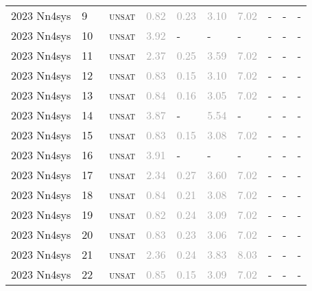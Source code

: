 \begin{center}
{\begin{longtable}{@{}llllllllll@{}}
2023 Nn4sys & 9 & ~\textsc{unsat} & \textcolor{darkgray}{0.82} & \textcolor{darkgray}{0.23} & \textcolor{darkgray}{3.10} & \textcolor{darkgray}{7.02} & - & - & - \\
2023 Nn4sys & 10 & ~\textsc{unsat} & \textcolor{darkgray}{3.92} & - & - & - & - & - & - \\
2023 Nn4sys & 11 & ~\textsc{unsat} & \textcolor{darkgray}{2.37} & \textcolor{darkgray}{0.25} & \textcolor{darkgray}{3.59} & \textcolor{darkgray}{7.02} & - & - & - \\
2023 Nn4sys & 12 & ~\textsc{unsat} & \textcolor{darkgray}{0.83} & \textcolor{darkgray}{0.15} & \textcolor{darkgray}{3.10} & \textcolor{darkgray}{7.02} & - & - & - \\
2023 Nn4sys & 13 & ~\textsc{unsat} & \textcolor{darkgray}{0.84} & \textcolor{darkgray}{0.16} & \textcolor{darkgray}{3.05} & \textcolor{darkgray}{7.02} & - & - & - \\
2023 Nn4sys & 14 & ~\textsc{unsat} & \textcolor{darkgray}{3.87} & - & \textcolor{darkgray}{5.54} & - & - & - & - \\
2023 Nn4sys & 15 & ~\textsc{unsat} & \textcolor{darkgray}{0.83} & \textcolor{darkgray}{0.15} & \textcolor{darkgray}{3.08} & \textcolor{darkgray}{7.02} & - & - & - \\
2023 Nn4sys & 16 & ~\textsc{unsat} & \textcolor{darkgray}{3.91} & - & - & - & - & - & - \\
2023 Nn4sys & 17 & ~\textsc{unsat} & \textcolor{darkgray}{2.34} & \textcolor{darkgray}{0.27} & \textcolor{darkgray}{3.60} & \textcolor{darkgray}{7.02} & - & - & - \\
2023 Nn4sys & 18 & ~\textsc{unsat} & \textcolor{darkgray}{0.84} & \textcolor{darkgray}{0.21} & \textcolor{darkgray}{3.08} & \textcolor{darkgray}{7.02} & - & - & - \\
2023 Nn4sys & 19 & ~\textsc{unsat} & \textcolor{darkgray}{0.82} & \textcolor{darkgray}{0.24} & \textcolor{darkgray}{3.09} & \textcolor{darkgray}{7.02} & - & - & - \\
2023 Nn4sys & 20 & ~\textsc{unsat} & \textcolor{darkgray}{0.83} & \textcolor{darkgray}{0.23} & \textcolor{darkgray}{3.06} & \textcolor{darkgray}{7.02} & - & - & - \\
2023 Nn4sys & 21 & ~\textsc{unsat} & \textcolor{darkgray}{2.36} & \textcolor{darkgray}{0.24} & \textcolor{darkgray}{3.83} & \textcolor{darkgray}{8.03} & - & - & - \\
2023 Nn4sys & 22 & ~\textsc{unsat} & \textcolor{darkgray}{0.85} & \textcolor{darkgray}{0.15} & \textcolor{darkgray}{3.09} & \textcolor{darkgray}{7.02} & - & - & - \\

\end{longtable}}
\end{center}
